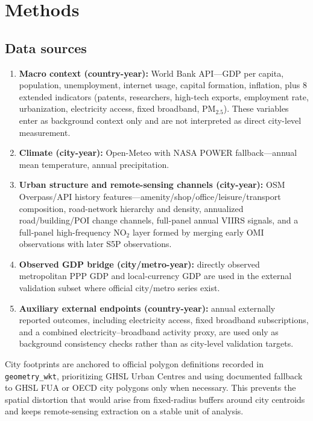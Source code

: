 \documentclass[oneside,pdflatex,sn-nature]{sn-jnl}
\begin{document}
\section{Methods}
\label{sec:data}

\subsection{Data sources}
\begin{enumerate}[label=(\roman*)]
  \item \textbf{Macro context (country-year):} World Bank API---GDP per capita, population, unemployment, internet usage, capital formation, inflation, plus 8 extended indicators (patents, researchers, high-tech exports, employment rate, urbanization, electricity access, fixed broadband, PM$_{2.5}$). These variables enter as background context only and are not interpreted as direct city-level measurement.
  \item \textbf{Climate (city-year):} Open-Meteo with NASA POWER fallback---annual mean temperature, annual precipitation.
  \item \textbf{Urban structure and remote-sensing channels (city-year):} OSM Overpass/API history features---amenity/shop/office/leisure/transport composition, road-network hierarchy and density, annualized road/building/POI change channels, full-panel annual VIIRS signals, and a full-panel high-frequency NO$_2$ layer formed by merging early OMI observations with later S5P observations.
  \item \textbf{Observed GDP bridge (city/metro-year):} directly observed metropolitan PPP GDP and local-currency GDP are used in the external validation subset where official city/metro series exist.
  \item \textbf{Auxiliary external endpoints (country-year):} annual externally reported outcomes, including electricity access, fixed broadband subscriptions, and a combined electricity--broadband activity proxy, are used only as background consistency checks rather than as city-level validation targets.
\end{enumerate}

City footprints are anchored to official polygon definitions recorded in \texttt{geometry\_wkt}, prioritizing GHSL Urban Centres and using documented fallback to GHSL FUA or OECD city polygons only when necessary. This prevents the spatial distortion that would arise from fixed-radius buffers around city centroids and keeps remote-sensing extraction on a stable unit of analysis.
\end{document}

